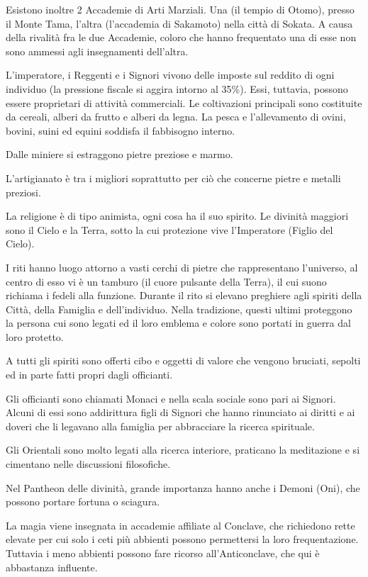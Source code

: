 Esistono inoltre 2 Accademie di Arti Marziali. Una (il tempio di
Otomo), presso il Monte Tama, l'altra (l'accademia di Sakamoto) nella
citt\`a di Sokata. A causa della rivalit\`a fra le due Accademie,
coloro che hanno frequentato una di esse non sono ammessi agli
insegnamenti dell'altra.

\Economia L'imperatore, i Reggenti e i Signori vivono delle imposte
sul reddito di ogni individuo (la pressione fiscale si aggira intorno
al 35\%). Essi, tuttavia, possono essere proprietari di attivit\`a
commerciali. Le coltivazioni principali sono costituite da cereali,
alberi da frutto e alberi da legna. La pesca e l'allevamento di ovini,
bovini, suini ed equini soddisfa il fabbisogno interno.

Dalle miniere si estraggono pietre preziose e marmo.

L'artigianato \`e tra i migliori soprattutto per ci\`o che concerne
pietre e metalli preziosi.

\Religione La religione \`e di tipo animista, ogni cosa ha il suo spirito. Le divinit\`a
maggiori sono il Cielo e la Terra, sotto la cui protezione vive l'Imperatore
(Figlio del Cielo).

I riti hanno luogo attorno a vasti cerchi di pietre che rappresentano
l'universo, al centro di esso vi \`e un tamburo (il cuore pulsante
della Terra), il cui suono richiama i fedeli alla funzione. Durante il
rito si elevano preghiere agli spiriti della Citt\`a, della Famiglia e
dell'individuo.  Nella tradizione, questi ultimi proteggono la persona
cui sono legati ed il loro emblema e colore sono portati in guerra dal
loro protetto.

A tutti gli spiriti sono offerti cibo e oggetti di valore che vengono
bruciati, sepolti ed in parte fatti propri dagli officianti. 

Gli officianti sono chiamati Monaci e nella scala sociale sono pari ai
Signori. Alcuni di essi sono addirittura figli di Signori che hanno
rinunciato ai diritti e ai doveri che li legavano alla famiglia per
abbracciare la ricerca spirituale.

Gli Orientali sono molto legati alla ricerca interiore, praticano la
meditazione e si cimentano nelle discussioni filosofiche.

Nel Pantheon delle divinit\`a, grande importanza hanno anche i Demoni
(Oni), che possono portare fortuna o sciagura.

\Magia La magia viene insegnata in accademie affiliate al Conclave, che
richiedono rette elevate per cui solo i ceti pi\`u abbienti possono
permettersi la loro frequentazione.  Tuttavia i meno abbienti possono
fare ricorso all'Anticonclave, che qui \`e abbastanza influente.

